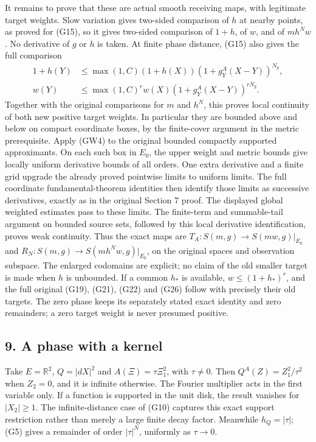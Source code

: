 \documentclass[
  11pt,
]{article}
\begin{document}
It remains to prove that these are actual smooth receiving maps, with
legitimate target weights. Slow variation gives two-sided comparison of
\(h\) at nearby points, as proved for (G15), so it gives two-sided
comparison of \(1+h\), of \(w\), and of \(mh^Nw\). No derivative of
\(g\) or \(h\) is taken. At finite phase distance, (G15) also gives the
full comparison \[
 \begin{aligned}
 1+h(Y)&\leq\max(1,C)(1+h(X))
                (1+g_Y^A(X-Y))^{N_g},\\
 w(Y)&\leq\max(1,C)^r w(X)
                (1+g_Y^A(X-Y))^{rN_g}.
 \end{aligned}
 \tag{GW5}
\] Together with the original comparisons for \(m\) and \(h^N\), this
proves local continuity of both new positive target weights. In
particular they are bounded above and below on compact coordinate boxes,
by the finite-cover argument in the metric prerequisite. Apply (GW4) to
the original bounded compactly supported approximants. On each such box
in \(E_0\), the upper weight and metric bounds give locally uniform
derivative bounds of all orders. One extra derivative and a finite grid
upgrade the already proved pointwise limits to uniform limits. The full
coordinate fundamental-theorem identities then identify those limits as
successive derivatives, exactly as in the original Section 7 proof. The
displayed global weighted estimates pass to these limits. The
finite-term and summable-tail argument on bounded source sets, followed
by this local derivative identification, proves weak continuity. Thus
the exact maps are \(T_A:S(m,g)\to S(mw,g)|_{E_0}\) and
\(R_N:S(m,g)\to S(mh^Nw,g)|_{E_0}\), on the original spaces and
observation subspace. The enlarged codomains are explicit; no claim of
the old smaller target is made when \(h\) is unbounded. If a common
\(h_*\) is available, \(w\leq(1+h_*)^r\), and the full original (G19),
(G21), (G22) and (G26) follow with precisely their old targets. The zero
phase keeps its separately stated exact identity and zero remainders; a
zero target weight is never presumed positive.

\subsection{9. A phase with a kernel}\label{a-phase-with-a-kernel}

Take \(E=\mathbb R^2\), \(Q=|dX|^2\) and \(A(\Xi)=\tau\Xi_1^2\), with
\(\tau\ne0\). Then \(Q^A(Z)=Z_1^2/\tau^2\) when \(Z_2=0\), and it is
infinite otherwise. The Fourier multiplier acts in the first variable
only. If a function is supported in the unit disk, the result vanishes
for \(|X_2|\geq1\). The infinite-distance case of (G10) captures this
exact support restriction rather than merely a large finite decay
factor. Meanwhile \(h_Q=|\tau|\); (G5) gives a remainder of order
\(|\tau|^N\), uniformly as \(\tau\to0\).
\end{document}
